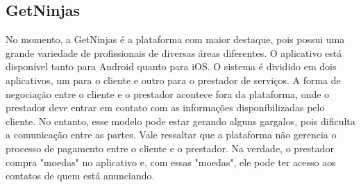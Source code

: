 

\subsection{GetNinjas}
No momento, a GetNinjas é a plataforma com maior destaque, pois possui uma grande variedade de profissionais de diversas áreas diferentes.
O aplicativo está disponível tanto para Android quanto para iOS. O sistema é dividido em dois aplicativos, um para o cliente e outro para o
prestador de serviços. A forma de negociação entre o cliente e o prestador acontece fora da plataforma, onde o prestador deve entrar em contato com as informações disponibilizadas pelo cliente. No entanto, esse modelo pode estar gerando alguns gargalos, pois dificulta a comunicação entre as partes. Vale ressaltar que a plataforma não gerencia o processo de pagamento entre o cliente e o prestador. Na verdade, o prestador compra "moedas" no aplicativo e, com essas "moedas", ele pode ter acesso aos contatos de quem está anunciando.
